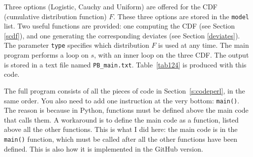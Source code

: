 \documentclass[10pt]{article}
\begin{document}
Three options (Logistic, Cauchy and Uniform) are offered for the CDF (cumulative distribution function) $F$. These three options are stored in the \texttt{model} list. Two useful functions are provided: one computing the CDF (see Section \ref{scdf}), and one generating the corresponding deviates (see Section \ref{deviates}). The parameter \texttt{type} specifies which distribution $F$ is used at any time. The main program performs a loop on $s$, with an inner loop on the three CDF. The output is stored in a text file named \texttt{PB\_main.txt}. Table~\ref{tab124} is produced with this code. \vspace{1ex} 

The full program consists of all the pieces of code in Section~\ref{s:codeperl}, in the same order. You also need to add one instruction at the very bottom: \texttt{main()}. The reason is because in Python, functions must be defined above the main code that calls them. A workaround is to define the main code as a function, listed above all the other functions. This is what I did here: the main code is in the \texttt{main()} function, which must be called after all the other functions have been defined. This is also how it is implemented in the GitHub version.
\end{document}

